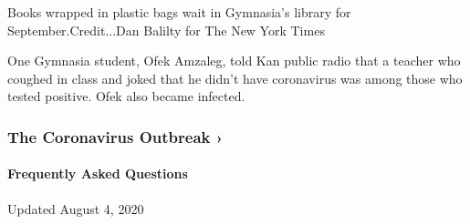 Books wrapped in plastic bags wait in Gymnasia's library for
September.Credit...Dan Balilty for The New York Times

One Gymnasia student, Ofek Amzaleg, told Kan public radio that a teacher
who coughed in class and joked that he didn't have coronavirus was among
those who tested positive. Ofek also became infected.

\href{https://www.nytimes.com/news-event/coronavirus?action=click\&pgtype=Article\&state=default\&region=MAIN_CONTENT_3\&context=storylines_faq}{}

\hypertarget{the-coronavirus-outbreak-}{%
\subsubsection{The Coronavirus Outbreak
›}\label{the-coronavirus-outbreak-}}

\hypertarget{frequently-asked-questions}{%
\paragraph{Frequently Asked
Questions}\label{frequently-asked-questions}}

Updated August 4, 2020

